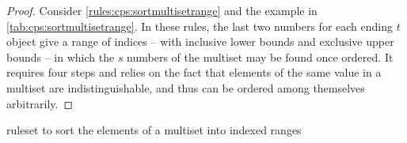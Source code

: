 \begin{proof}
Consider \cref{rules:cps:sortmultisetrange} and the example in \cref{tab:cps:sortmultisetrange}.  In these rules, the last two numbers for each ending \(t\) object give a range of indices -- with inclusive lower bounds and exclusive upper bounds -- in which the \(s\) numbers of the multiset may be found once ordered.  It requires four steps and relies on the fact that elements of the same value in a multiset are indistinguishable, and thus can be ordered among themselves arbitrarily.

\end{proof}

\begin{cprulesetfloat} \begin{cpruleset}





\end{cpruleset}
\caption{\label{rules:cps:sortmultisetrange}\Gls{ruleset} to sort the elements of a multiset into indexed ranges}
\end{cprulesetfloat}

